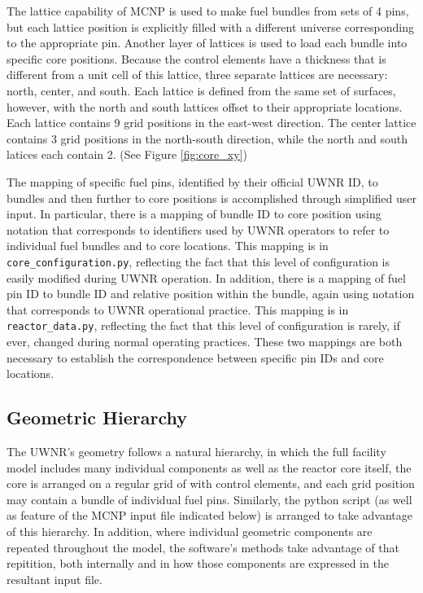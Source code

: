 \documentclass{UWNR_modeling}
\begin{document}
The lattice capability of MCNP is used to make fuel bundles from sets of 4 pins, but each lattice position is explicitly filled with a different universe corresponding to the appropriate pin.  Another layer of lattices is used to load each bundle into specific core positions.  Because the control elements have a thickness that is different from a unit cell of this lattice, three separate lattices are necessary: north, center, and south.  Each lattice is defined from the same set of surfaces, however, with the north and south lattices offset to their appropriate locations.  Each lattice contains 9 grid positions in the east-west direction.  The center lattice contains 3 grid positions in the north-south direction, while the north and south latices each contain 2.  (See Figure \ref{fig:core_xy})

The mapping of specific fuel pins, identified by their official UWNR ID, to bundles and then further to core positions is accomplished through simplified user input.  In particular, there is a mapping of bundle ID to core position using notation that corresponds to identifiers used by UWNR operators to refer to individual fuel bundles and to core locations.  This mapping is in \texttt{core\_configuration.py}, reflecting the fact that this level of configuration is easily modified during UWNR operation. In addition, there is a mapping of fuel pin ID to bundle ID and relative position within the bundle, again using notation that corresponds to UWNR operational practice.  This mapping is in \texttt{reactor\_data.py}, reflecting the fact that this level of configuration is rarely, if ever, changed during normal operating practices.  These two mappings are both necessary to establish the correspondence between specific pin IDs and core locations.


\subsection{Geometric Hierarchy}\label{ssection:geom_hier}

The UWNR's geometry follows a natural hierarchy, in which the full facility model includes many individual components as well as the reactor core itself, the core is arranged on a regular grid of with control elements, and each grid position may contain a bundle of individual fuel pins.  Similarly, the python script (as well as feature of the MCNP input file indicated below) is arranged to take advantage of this hierarchy.  In addition, where individual geometric components are repeated throughout the model, the software's methods take advantage of that repitition, both internally and in how those components are expressed in the resultant input file.
\end{document}
